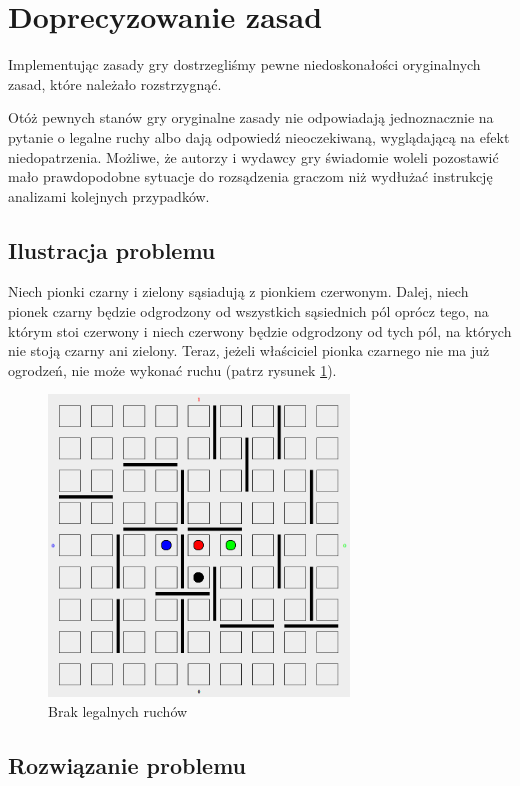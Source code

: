 \documentclass{pracamgr}
\begin{document}
\section{Doprecyzowanie zasad}

Implementując zasady gry dostrzegliśmy pewne niedoskonałości oryginalnych zasad, które należało rozstrzygnąć.

Otóż pewnych stanów gry oryginalne zasady nie odpowiadają jednoznacznie na pytanie o legalne ruchy albo dają odpowiedź nieoczekiwaną, wyglądającą na efekt niedopatrzenia.
Możliwe, że autorzy i wydawcy gry świadomie woleli pozostawić mało prawdopodobne sytuacje do rozsądzenia graczom niż wydłużać instrukcję analizami kolejnych przypadków.

\subsection*{Ilustracja problemu}

Niech pionki czarny i zielony sąsiadują z pionkiem czerwonym. Dalej, niech pionek czarny będzie odgrodzony od wszystkich sąsiednich pól oprócz tego, na którym stoi czerwony i niech czerwony będzie odgrodzony od tych pól, na których nie stoją czarny ani zielony. Teraz, jeżeli właściciel pionka czarnego nie ma już ogrodzeń, nie może wykonać ruchu (patrz rysunek \ref{problem}).

\begin{figure}[ht!]
\centering
\includegraphics[width=80mm]{no-move.png}
\caption{Brak legalnych ruchów \label{problem}}
\end{figure}

\subsection*{Rozwiązanie problemu}
\end{document}
